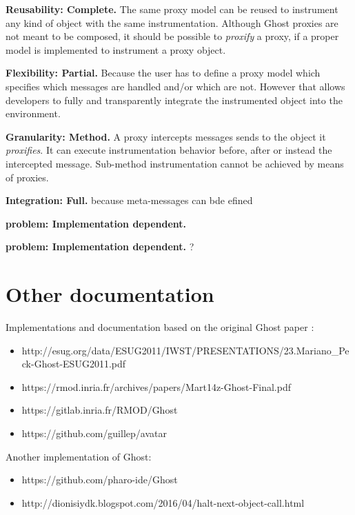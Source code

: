 \documentclass[10pt,twoside,english]{_support/latex/sbabook/sbabook}
\begin{document}
\textbf{Reusability: Complete.} The same proxy model can be reused to instrument any kind of object with the same instrumentation. Although Ghost proxies are not meant to be composed, it should be possible to \textit{proxify} a proxy, if a proper model is implemented to instrument a proxy object.

\textbf{Flexibility: Partial.} Because the user has to define a proxy model which specifies which messages are handled and/or which are not. However that allows developers to fully and transparently integrate the instrumented object into the environment.

\textbf{Granularity: Method.} A proxy intercepts messages sends to the object it \textit{proxifies}. It can execute instrumentation behavior before, after or instead the intercepted message. Sub-method instrumentation cannot be achieved by means of proxies.

\textbf{Integration: Full.} because meta-messages can bde efined

\textbf{ problem: Implementation dependent.}

\textbf{ problem: Implementation dependent.} ?
\section{Other documentation}
Implementations and documentation based on the original Ghost paper \cite{Mart14z}:

\begin{itemize}
\item http://esug.org/data/ESUG2011/IWST/PRESENTATIONS/23.Mariano\_Peck-Ghost-ESUG2011.pdf
\item https://rmod.inria.fr/archives/papers/Mart14z-Ghost-Final.pdf
\item https://gitlab.inria.fr/RMOD/Ghost
\item https://github.com/guillep/avatar
\end{itemize}

Another implementation of Ghost:

\begin{itemize}
\item https://github.com/pharo-ide/Ghost
\item http://dionisiydk.blogspot.com/2016/04/halt-next-object-call.html
\end{itemize}






\backmatter

\end{document}
